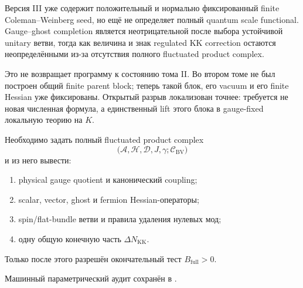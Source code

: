 \begin{theorem}
Версия III уже содержит положительный и нормально фиксированный finite
Coleman--Weinberg seed, но ещё не определяет полный quantum scale
functional. Gauge--ghost completion является неотрицательной после выбора
устойчивой unitary ветви, тогда как величина и знак regulated KK correction
остаются неопределёнными из-за отсутствия полного fluctuated product
complex.
\end{theorem}

Это не возвращает программу к состоянию тома II. Во втором томе не был
построен общий finite parent block; теперь такой блок, его vacuum и его
finite Hessian уже фиксированы. Открытый разрыв локализован точнее: требуется
не новая численная формула, а единственный lift этого блока в gauge-fixed
локальную теорию на \(K\).

\begin{protocol}
Необходимо задать полный fluctuated product complex
\begin{equation}
\bigl(\mathcal A,\mathcal H,\mathcal D,J,\gamma;
  \mathcal C_{\mathrm{BV}})
\end{equation}
и из него вывести:
\begin{enumerate}
 \item physical gauge quotient и канонический coupling;
 \item scalar, vector, ghost и fermion Hessian-операторы;
 \item spin/flat-bundle ветви и правила удаления нулевых мод;
 \item одну общую конечную часть \(\Delta N_{\mathrm{KK}}\).
\end{enumerate}
Только после этого разрешён окончательный тест
\(B_{\mathrm{full}}>0\).
\end{protocol}

Машинный параметрический аудит сохранён в
.